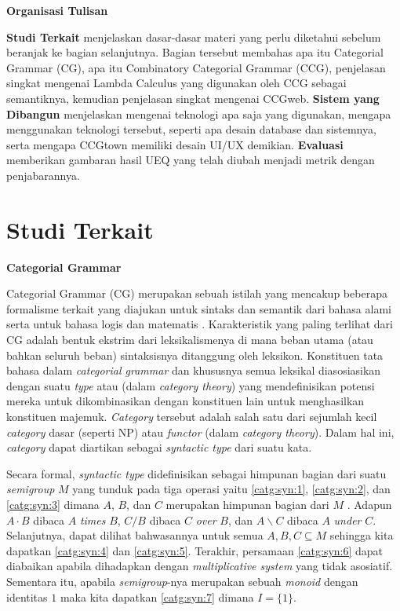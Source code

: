 \noindent \textbf{Organisasi Tulisan}

\textbf{Studi Terkait} menjelaskan dasar-dasar materi yang perlu diketahui sebelum beranjak ke bagian
selanjutnya. Bagian tersebut membahas apa itu Categorial Grammar (CG), apa itu Combinatory
Categorial Grammar (CCG), penjelasan singkat mengenai Lambda Calculus yang digunakan oleh CCG sebagai
semantiknya, kemudian penjelasan singkat mengenai CCGweb.
\textbf{Sistem yang Dibangun} menjelaskan mengenai teknologi apa saja yang digunakan, mengapa
menggunakan teknologi tersebut, seperti apa desain database dan sistemnya, serta mengapa CCGtown
memiliki desain UI/UX demikian.
\textbf{Evaluasi} memberikan gambaran hasil UEQ yang telah diubah menjadi metrik dengan penjabarannya.



\section{Studi Terkait}

\noindent\textbf{Categorial Grammar}

Categorial Grammar (CG) merupakan sebuah istilah yang mencakup beberapa formalisme terkait yang diajukan
untuk sintaks dan semantik dari bahasa alami serta untuk bahasa logis dan matematis \citep{Steedman92catg}.
Karakteristik yang paling terlihat dari CG adalah bentuk ekstrim dari leksikalismenya di mana beban utama
(atau bahkan seluruh beban) sintaksisnya ditanggung oleh leksikon.
Konstituen tata bahasa dalam \textit{categorial grammar} dan khususnya semua leksikal diasosiasikan
dengan suatu \textit{type} atau  (dalam \textit{category theory}) yang
mendefinisikan potensi mereka untuk dikombinasikan dengan konstituen lain untuk menghasilkan konstituen
majemuk.
\textit{Category} tersebut adalah salah satu dari sejumlah kecil \textit{category} dasar (seperti NP)
atau \textit{functor} (dalam \textit{category theory}).
Dalam hal ini, \textit{category} dapat diartikan sebagai \textit{syntactic type} dari suatu kata.

Secara formal, \textit{syntactic type} didefinisikan sebagai himpunan bagian dari suatu
\textit{semigroup} $M$ yang tunduk pada tiga operasi yaitu \ref{catg:syn:1},
\ref{catg:syn:2}, dan \ref{catg:syn:3} dimana $A$, $B$, dan $C$ merupakan himpunan bagian dari $M$
\citep{Lambek1988}. Adapun $A \cdot B$ dibaca $A$ \textit{times} $B$, $C/B$ dibaca $C$ \textit{over}
$B$, dan $A\backslash{}C$ dibaca $A$ \textit{under} $C$. Selanjutnya, dapat dilihat bahwasannya
untuk semua $A, B, C \subseteq M$ sehingga kita dapatkan \ref{catg:syn:4} dan \ref{catg:syn:5}.
Terakhir, persamaan \ref{catg:syn:6} dapat diabaikan apabila dihadapkan dengan
\textit{multiplicative system} yang tidak asosiatif. Sementara itu, apabila \textit{semigroup}-nya
merupakan sebuah \textit{monoid} dengan identitas $1$ maka kita dapatkan \ref{catg:syn:7} dimana
$I = \{1\}$.

